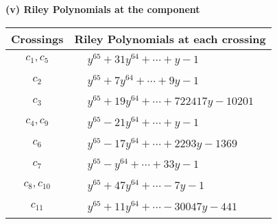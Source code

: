 \documentclass[1p]{elsarticle_modified}
\theoremstyle{definition}
\begin{document}
\newpage\renewcommand{\arraystretch}{1}
\flushleft \textbf{(v) Riley Polynomials at the component}\newline \\
\begin{tabular}{m{50pt}|m{274pt}}
Crossings & \hspace{64pt}Riley Polynomials at each crossing \\
\hline $$\begin{aligned}c_{1},c_{5}\end{aligned}$$&$\begin{aligned}
&y^{65}+31 y^{64}+\cdots+y-1
\end{aligned}$\\
\hline $$\begin{aligned}c_{2}\end{aligned}$$&$\begin{aligned}
&y^{65}+7 y^{64}+\cdots+9 y-1
\end{aligned}$\\
\hline $$\begin{aligned}c_{3}\end{aligned}$$&$\begin{aligned}
&y^{65}+19 y^{64}+\cdots+722417 y-10201
\end{aligned}$\\
\hline $$\begin{aligned}c_{4},c_{9}\end{aligned}$$&$\begin{aligned}
&y^{65}-21 y^{64}+\cdots+y-1
\end{aligned}$\\
\hline $$\begin{aligned}c_{6}\end{aligned}$$&$\begin{aligned}
&y^{65}-17 y^{64}+\cdots+2293 y-1369
\end{aligned}$\\
\hline $$\begin{aligned}c_{7}\end{aligned}$$&$\begin{aligned}
&y^{65}- y^{64}+\cdots+33 y-1
\end{aligned}$\\
\hline $$\begin{aligned}c_{8},c_{10}\end{aligned}$$&$\begin{aligned}
&y^{65}+47 y^{64}+\cdots-7 y-1
\end{aligned}$\\
\hline $$\begin{aligned}c_{11}\end{aligned}$$&$\begin{aligned}
&y^{65}+11 y^{64}+\cdots-30047 y-441
\end{aligned}$\\
\hline
\end{tabular}\\~\\
\end{document}
